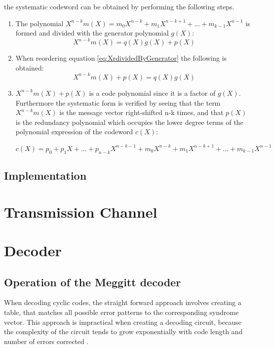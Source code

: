 \documentclass[Main]{subfiles}
\begin{document}
the systematic codeword can be obtained by performing the following steps.

\begin{enumerate}
\item The polynomial $X^{n-k}m(X) = m_0X^{n-k} + m_1X^{n-k+1} + ... +m_{k-1}X^{n-1}$ is formed and divided with the generator polynomial $g(X)$:
\begin{equation} \label{eq:XrdividedByGenerator}
X^{n-k}m(X) = q(X)g(X)+p(X)
\end{equation}

\item When reordering equation \ref{eq:XrdividedByGenerator} the following is obtained:
\begin{equation} \label{eq:XrdividedByGeneratorReoreded}
X^{n-k}m(X)+ p(X)=q(X)g(X)
\end{equation}

\item $X^{n-k}m(X)+p(X)$ is a code polynomial since it is a factor of $g(X)$. Furthermore the systematic form is verified by seeing that the term $X^{n-k}m(X)$ is the message vector right-shifted n-k times, and that $p(X)$ is the redundancy polynomial which occupies the lower degree terms of the polynomial expression of the codeword $c(X)$:

{\centering 
$c(X) = p_0 + p_1X + ... + p_{n-k}X^{n-k-1} + m_0X^{n-k} + m_1X^{n-k+1}+...+m_{k-1}X^{n-1}$ \par}

\end{enumerate}

\subsection{Implementation}


\section{Transmission Channel}

\section{Decoder}

\subsection{Operation of the Meggitt decoder}

When decoding cyclic codes, the straight forward approach involves creating a table, that matches all possible error patterns to the corresponding syndrome vector. This approach is impractical when creating a decoding circuit, because the complexity of the circuit tends to grow exponentially with code length and number of errors corrected \cite{lec7}.
\end{document}
